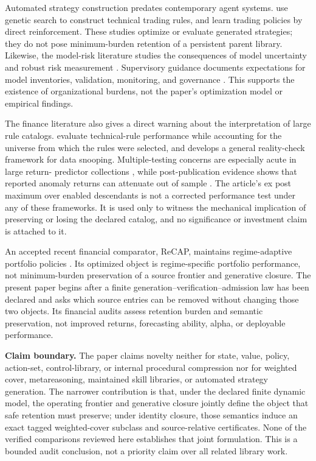 Automated strategy construction predates contemporary agent systems.
\citet{AllenKarjalainen1999} use genetic search to construct technical trading
rules, and \citet{MoodySaffell2001} learn trading policies by direct
reinforcement. These studies optimize or evaluate generated strategies; they
do not pose minimum-burden retention of a persistent parent library. Likewise,
the model-risk literature studies the consequences of model uncertainty and
robust risk measurement \citep{Cont2006,GlassermanXu2014}. Supervisory guidance
documents expectations for model inventories, validation, monitoring, and
governance \citep{FederalReserveOCC2011}. This supports the existence of
organizational burdens, not the paper's optimization model or empirical
findings.

The finance literature also gives a direct warning about the interpretation of
large rule catalogs. \citet{SullivanTimmermannWhite1999} evaluate technical-rule
performance while accounting for the universe from which the rules were
selected, and \citet{White2000} develops a general reality-check framework for
data snooping. Multiple-testing concerns are especially acute in large return-
predictor collections \citep{HarveyLiuZhu2016}, while post-publication evidence
shows that reported anomaly returns can attenuate out of sample
\citep{McLeanPontiff2016}. The article's ex post maximum over enabled descendants
is not a corrected performance test under any of these frameworks. It is used
only to witness the mechanical implication of preserving or losing the declared
catalog, and no significance or investment claim is attached to it.

An accepted recent financial comparator, ReCAP, maintains regime-adaptive
portfolio policies \citep{PanEtAl2026ReCAP}. Its optimized object is
regime-specific portfolio performance, not minimum-burden preservation of a
source frontier and generative closure. The present paper begins after a finite
generation--verification--admission law has been declared and asks which source
entries can be removed without changing those two objects. Its financial
audits assess retention burden and semantic preservation, not improved returns,
forecasting ability, alpha, or deployable performance.

\medskip\noindent\textbf{Claim boundary.}
The paper claims novelty neither for state, value, policy, action-set,
control-library, or internal procedural compression nor for weighted cover,
metareasoning, maintained skill libraries, or automated strategy generation.
The narrower contribution is that, under the declared finite dynamic model,
the operating frontier and generative closure jointly define the object that
safe retention must preserve; under identity closure, those semantics induce
an exact tagged weighted-cover subclass and source-relative certificates.
None of the verified comparisons reviewed here establishes that joint
formulation. This is a bounded audit conclusion, not a priority claim over all
related library work.
